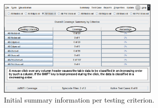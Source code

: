 
\begin{figure}[!ht]
\begin{center}
\includegraphics[width=0.70\textwidth]{fig/summary-by-criterion-initial-edited.eps}
\caption{\label{fig:initial-summary-criterion} Initial summary
information per testing criterion.}
\end{center}
\end{figure}
